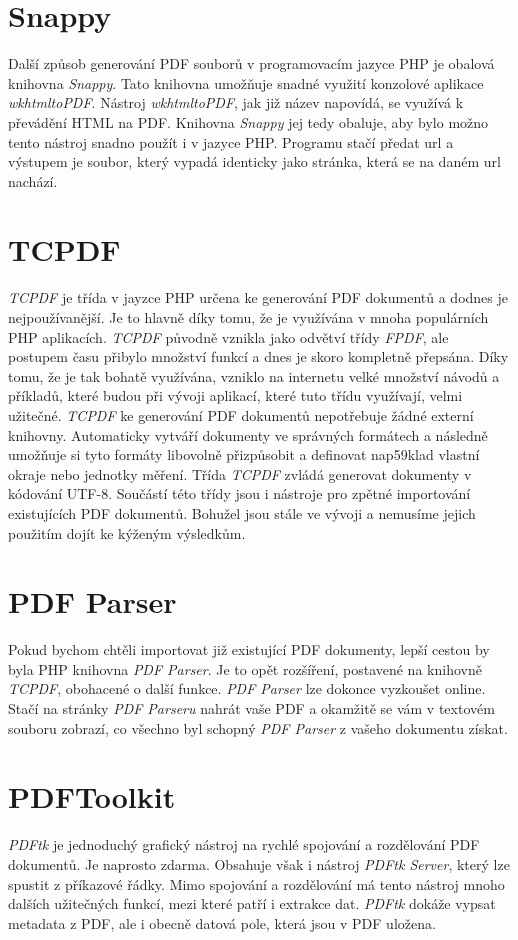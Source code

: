 \documentclass[czech,BP]{thesiskiv}
\begin{document}
\section{Snappy}
Další způsob generování PDF souborů v programovacím jazyce PHP je obalová knihovna \emph{Snappy}. Tato knihovna umožňuje snadné využití konzolové aplikace \emph{wkhtmltoPDF}. Nástroj \emph{wkhtmltoPDF}, jak již název napovídá, se využívá k převádění HTML na PDF. Knihovna \emph{Snappy} jej tedy obaluje, aby bylo možno tento nástroj snadno použít i v jazyce PHP. Programu stačí předat url a výstupem je soubor, který vypadá identicky jako stránka, která se na daném url nachází\cite{Snappy}\cite{wkhtmltoPDF}.
\section{TCPDF}
\emph{TCPDF} je třída v jayzce PHP určena ke generování PDF dokumentů a dodnes je nejpoužívanější. Je to hlavně díky tomu, že je využívána v mnoha populárních PHP aplikacích. \emph{TCPDF} původně vznikla jako odvětví třídy \emph{FPDF}, ale postupem času přibylo množství funkcí a dnes je skoro kompletně přepsána. Díky tomu, že je tak bohatě využívána, vzniklo na internetu velké množství návodů a příkladů, které budou při vývoji aplikací, které tuto třídu využívají, velmi užitečné. \emph{TCPDF} ke generování PDF dokumentů nepotřebuje žádné externí knihovny. Automaticky vytváří dokumenty ve správných formátech a následně umožňuje si tyto formáty libovolně přizpůsobit a definovat nap59klad vlastní okraje nebo jednotky měření. Třída \emph{TCPDF} zvládá generovat dokumenty v kódování UTF-8. Součástí této třídy jsou i nástroje pro zpětné importování existujících PDF dokumentů. Bohužel jsou stále ve vývoji a nemusíme jejich použitím dojít ke kýženým výsledkům. \cite{TCPDF} \cite{FPDF_Book}
\section{PDF Parser}
Pokud bychom chtěli importovat již existující PDF dokumenty, lepší cestou by byla PHP knihovna \emph{PDF Parser}. Je to opět rozšíření, postavené na knihovně \emph{TCPDF}, obohacené o další funkce. \emph{PDF Parser} lze dokonce vyzkoušet online. Stačí na stránky \emph{PDF Parseru} nahrát vaše PDF a okamžitě se vám v textovém souboru zobrazí, co všechno byl schopný \emph{PDF Parser} z vašeho dokumentu získat\cite{PDF_Parser}. 
\section{PDFToolkit}
\emph{PDFtk} je jednoduchý grafický nástroj na rychlé spojování a rozdělování PDF dokumentů. Je naprosto zdarma. Obsahuje však i nástroj \emph{PDFtk Server}, který lze spustit z příkazové řádky. Mimo spojování a rozdělování má tento nástroj mnoho dalších užitečných funkcí, mezi které patří i extrakce dat. \emph{PDFtk} dokáže vypsat metadata z PDF, ale i obecně datová pole, která jsou v PDF uložena\cite{PDF_Toolkit}.
\end{document}
